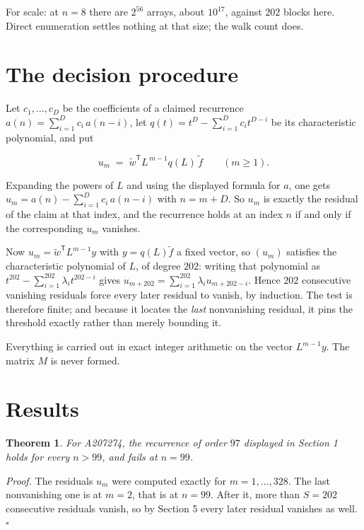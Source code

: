 \documentclass[11pt]{article}
\newtheorem{theorem}{Theorem}
\theoremstyle{definition}
\begin{document}
For scale: at $n = 8$ there are $2^{56}$ arrays, about $10^{17}$, against $202$ blocks here. Direct enumeration settles nothing at that size; the walk count does.

\section{The decision procedure}

Let $c_1,\dots,c_D$ be the coefficients of a claimed recurrence $a(n) = \sum_{i=1}^{D} c_i\,a(n-i)$, let $q(t) = t^{D} - \sum_{i=1}^{D} c_i t^{D-i}$ be its characteristic polynomial, and put

\[u_m \;=\; \tilde w^{\mathsf T} L^{\,m-1} q(L)\,\tilde f \qquad (m \ge 1).\]

Expanding the powers of $L$ and using the displayed formula for $a$, one gets $u_m = a(n) - \sum_{i=1}^{D} c_i\,a(n-i)$ with $n = m + D$. So $u_m$ is exactly the residual of the claim at that index, and the recurrence holds at an index $n$ if and only if the corresponding $u_m$ vanishes.

Now $u_m = \tilde w^{\mathsf T} L^{m-1} y$ with $y = q(L)\tilde f$ a fixed vector, so $(u_m)$ satisfies the characteristic polynomial of $L$, of degree $202$: writing that polynomial as $t^{202} - \sum_{i=1}^{202} \lambda_i t^{202-i}$ gives $u_{m+202} = \sum_{i=1}^{202} \lambda_i u_{m+202-i}$. Hence $202$ consecutive vanishing residuals force every later residual to vanish, by induction. The test is therefore finite; and because it locates the {\itshape last} nonvanishing residual, it pins the threshold exactly rather than merely bounding it.

Everything is carried out in exact integer arithmetic on the vector $L^{m-1}y$. The matrix $M$ is never formed.

\section{Results}

\begin{theorem} For A207274, the recurrence of order $97$ displayed in Section 1 holds for every $n > 99$, and fails at $n = 99$.\end{theorem}

{\itshape Proof.} The residuals $u_m$ were computed exactly for $m = 1,\dots,328$. The last nonvanishing one is at $m = 2$, that is at $n = 99$. After it, more than $S = 202$ consecutive residuals vanish, so by Section 5 every later residual vanishes as well. $\square$
\end{document}
